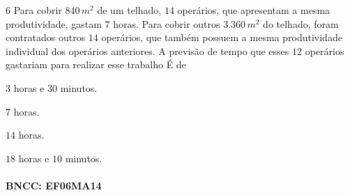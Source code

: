
\num{6}  Para cobrir $840\,m^2$ de um telhado, $14$ operários, que apresentam a
mesma produtividade, gastam $7$ horas. Para cobrir outros $3.360\,m^2$ do
telhado, foram contratados outros $14$ operários, que também possuem a
mesma produtividade individual dos operários anteriores. A previsão de
tempo que esses $12$ operários gastariam para realizar esse trabalho É de

\begin{escolha}
\item $3$ horas e $30$ minutos.
\item $7$ horas.
\item $14$ horas.
\item $18$ horas e $10$ minutos.
\end{escolha}

\paragraph{BNCC: EF06MA14 }


